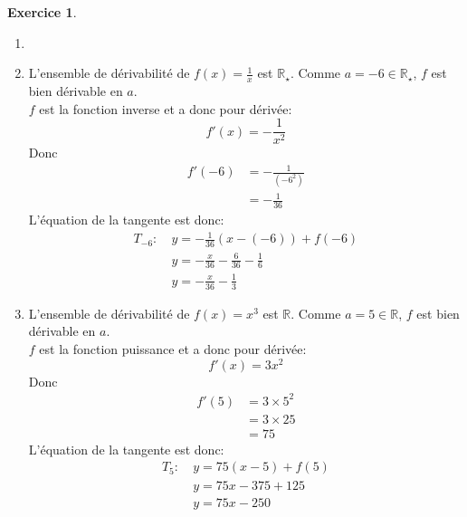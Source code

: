 \documentclass{exam}
\theoremstyle{definition}
\newtheorem{exercice}{Exercice}
\begin{document}
\begin{exercice}
    \begin{enumerate}
        \item[]
        \item L'ensemble de dérivabilité de $f(x) = \frac{1}{x}$ est $\mathbb{R}_\star$. Comme $a = -6 \in \mathbb{R}_\star$, $f$ est bien dérivable en $a$.\\
        $f$ est la fonction inverse et a donc pour dérivée:
        $$
            f'(x) = -\frac{1}{x^2}
        $$
        Donc
        \begin{align*}
            f'(-6) &= -\frac{1}{(-6^2)}\\
            &= -\frac{1}{36}
        \end{align*}
        L'équation de la tangente est donc:
        \begin{align*}
            T_{-6}:\ & y = -\frac{1}{36}(x - (-6)) + f(-6)\\
            & y = -\frac{x}{36} - \frac{6}{36} - \frac{1}{6}\\
            & y = -\frac{x}{36} - \frac{1}{3}
        \end{align*}
        \item L'ensemble de dérivabilité de $f(x) = x^3$ est $\mathbb{R}$. Comme $a = 5 \in \mathbb{R}$, $f$ est bien dérivable en $a$.\\
        $f$ est la fonction puissance et a donc pour dérivée:
        $$
            f'(x) = 3x^2
        $$
        Donc
        \begin{align*}
            f'(5) &= 3\times5^2\\
            &= 3\times25\\
            &= 75
        \end{align*}
        L'équation de la tangente est donc:
        \begin{align*}
            T_5:\ & y = 75(x - 5) + f(5)\\
            & y = 75x - 375 + 125\\
            & y = 75x - 250
        \end{align*}
    \end{enumerate}
\end{exercice}
\end{document}
